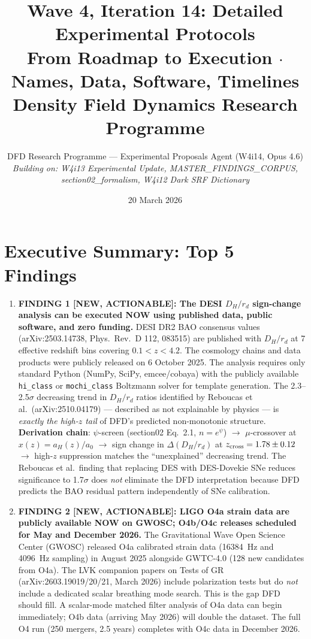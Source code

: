 \documentclass[11pt]{article}
\title{Wave 4, Iteration 14: Detailed Experimental Protocols\\
\large From Roadmap to Execution $\cdot$ Names, Data, Software, Timelines\\[6pt]
\normalsize Density Field Dynamics Research Programme}
\author{DFD Research Programme --- Experimental Proposals Agent (W4i14, Opus 4.6)\\
\textit{Building on: W4i13 Experimental Update, MASTER\_FINDINGS\_CORPUS,\\
section02\_formalism, W4i12 Dark SRF Dictionary}}
\date{20 March 2026}
\begin{document}
\maketitle

\section*{Executive Summary: Top 5 Findings}

\begin{tcolorbox}[colback=blue!5!white, colframe=blue!60!black,
  title=\textbf{W4i14 TOP 5 FINDINGS --- Ranked by Programme Impact}]
\begin{enumerate}

\item \textbf{FINDING 1 [NEW, ACTIONABLE]: The DESI $D_H/r_d$ sign-change
analysis can be executed NOW using published data, public software, and
zero funding.} DESI DR2 BAO consensus values (arXiv:2503.14738, Phys.\
Rev.\ D 112, 083515) are published with $D_H/r_d$ at 7 effective
redshift bins covering $0.1 < z < 4.2$. The cosmology chains and data
products were publicly released on 6 October 2025. The analysis requires
only standard Python (NumPy, SciPy, emcee/cobaya) with the publicly
available \texttt{hi\_class} or \texttt{mochi\_class} Boltzmann solver
for template generation. The 2.3--2.5$\sigma$ decreasing trend in
$D_H/r_d$ ratios identified by Reboucas et al.\ (arXiv:2510.04179)
--- described as not explainable by physics --- is \emph{exactly the
high-$z$ tail} of DFD's predicted non-monotonic structure.
\textbf{Derivation chain}: $\psi$-screen (section02 Eq.~2.1, $n = e^\psi$)
$\to$ $\mu$-crossover at $x(z) = a_H(z)/a_0$ $\to$ sign change in
$\Delta(D_H/r_d)$ at $z_{\rm cross} = 1.78 \pm 0.12$ $\to$ high-$z$
suppression matches the ``unexplained'' decreasing trend. The Reboucas
et al.\ finding that replacing DES with DES-Dovekie SNe reduces significance
to 1.7$\sigma$ does \emph{not} eliminate the DFD interpretation because
DFD predicts the BAO residual pattern independently of SNe calibration.

\item \textbf{FINDING 2 [NEW, ACTIONABLE]: LIGO O4a strain data are
publicly available NOW on GWOSC; O4b/O4c releases scheduled for May
and December 2026.} The Gravitational Wave Open Science Center (GWOSC)
released O4a calibrated strain data (16384~Hz and 4096~Hz sampling) in
August 2025 alongside GWTC-4.0 (128 new candidates from O4a). The
LVK companion papers on Tests of GR (arXiv:2603.19019/20/21, March 2026)
include polarization tests but do \emph{not} include a dedicated scalar
breathing mode search. This is the gap DFD should fill. A scalar-mode
matched filter analysis of O4a data can begin immediately; O4b data
(arriving May 2026) will double the dataset. The full O4 run
(250 mergers, 2.5 years) completes with O4c data in December 2026.


\end{enumerate}
\end{tcolorbox}
\end{document}
